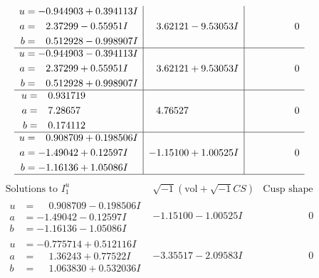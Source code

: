 \documentclass[1p]{elsarticle_modified}
\theoremstyle{definition}
\newcommand{\I}{\sqrt{-1}}
\begin{document}
$$\begin{array}{c|c|c}
\begin{aligned}
u &= -0.944903 + 0.394113 I \\
a &= \phantom{-}2.37299 - 0.55951 I \\
b &= \phantom{-}0.512928 - 0.998907 I\end{aligned}
 & \phantom{-}3.62121 - 9.53053 I & \phantom{-0.000000 } 0 \\ \hline\begin{aligned}
u &= -0.944903 - 0.394113 I \\
a &= \phantom{-}2.37299 + 0.55951 I \\
b &= \phantom{-}0.512928 + 0.998907 I\end{aligned}
 & \phantom{-}3.62121 + 9.53053 I & \phantom{-0.000000 } 0 \\ \hline\begin{aligned}
u &= \phantom{-}0.931719\phantom{ +0.000000I} \\
a &= \phantom{-}7.28657\phantom{ +0.000000I} \\
b &= \phantom{-}0.174112\phantom{ +0.000000I}\end{aligned}
 & \phantom{-}4.76527\phantom{ +0.000000I} & \phantom{-0.000000 } 0 \\ \hline\begin{aligned}
u &= \phantom{-}0.908709 + 0.198506 I \\
a &= -1.49042 + 0.12597 I \\
b &= -1.16136 + 1.05086 I\end{aligned}
 & -1.15100 + 1.00525 I & \phantom{-0.000000 } 0\\
 \hline 
 \end{array}$$\newpage$$\begin{array}{c|c|c}  
\text{Solutions to }I^u_{1}& \I (\text{vol} + \sqrt{-1}CS) & \text{Cusp shape}\\
 \hline 
\begin{aligned}
u &= \phantom{-}0.908709 - 0.198506 I \\
a &= -1.49042 - 0.12597 I \\
b &= -1.16136 - 1.05086 I\end{aligned}
 & -1.15100 - 1.00525 I & \phantom{-0.000000 } 0 \\ \hline\begin{aligned}
u &= -0.775714 + 0.512116 I \\
a &= \phantom{-}1.36243 + 0.77522 I \\
b &= \phantom{-}1.063830 + 0.532036 I\end{aligned}
 & -3.35517 - 2.09583 I & \phantom{-0.000000 } 0 \\ \hline\begin{aligned}

\end{aligned}
\end{array}$$
\end{document}
